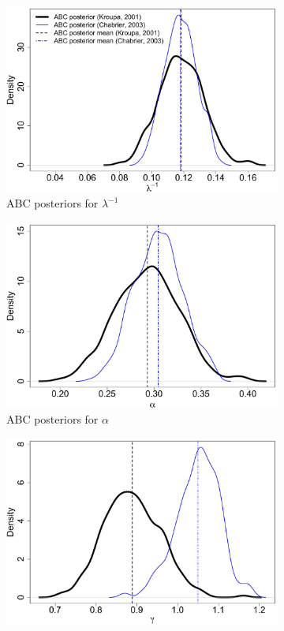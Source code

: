 \documentclass[ejs]{imsart}
\numberwithin{equation}{section}
\theoremstyle{plain}
\begin{document}
\begin{figure}[htbp]
\begin{subfigure}{0.32\textwidth}
\centering
\includegraphics[width = .95\textwidth]{figures/kc_k_rev1.pdf} 
\caption{ABC posteriors for $\lambda^{-1}$}\label{subfig:kc_k}
\end{subfigure}
\begin{subfigure}{0.32\textwidth}
\centering
\includegraphics[width = .95\textwidth]{figures/kc_alpha_rev1.pdf} 
\caption{ABC posteriors for $\alpha$}\label{subfig:kc_alpha}
\end{subfigure}
\begin{subfigure}{0.32\textwidth}
\centering
\includegraphics[width = .95\textwidth]{figures/kc_gamma_rev1.pdf} 

\end{subfigure}
\end{figure}
\end{document}
